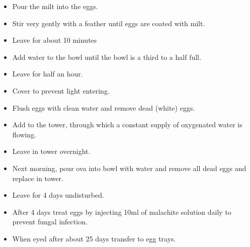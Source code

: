 \begin{itemize}
\item Pour the milt into the eggs. 
\item Stir very gently with a feather until eggs are coated with milt.
\item Leave for about 10 minutes
\item Add water to the bowl until the bowl is a third to a half full. 
\item Leave for half an hour.
\item Cover to prevent light entering.
\item Flush eggs with clean water and remove dead (white) eggs.
\item Add to the tower, through which a constant supply of oxygenated water is flowing. 
\item Leave in tower overnight.
\item Next morning, pour ova into bowl with water and remove all dead eggs and replace in tower.
\item Leave for 4 days undisturbed. 
\item After 4 days treat eggs by injecting 10ml of malachite solution daily to prevent fungal infection.  
\item When eyed after about 25 days transfer to egg trays.
\end{itemize}

    

